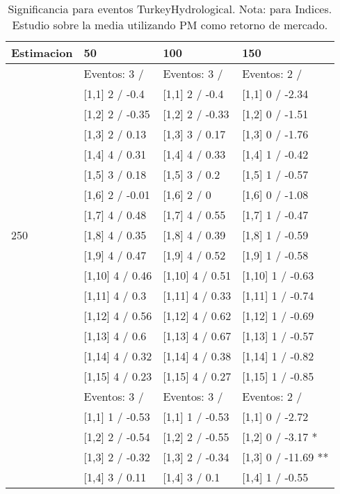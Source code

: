 \begin{table}

\caption{Significancia para eventos TurkeyHydrological. Nota: para Indices. Estudio sobre la media utilizando PM como retorno de mercado.}
\centering
\begin{tabular}[t]{llll}
\toprule
Estimacion & 50 & 100 & 150\\
\midrule
 & Eventos:  3 / & Eventos:  3 / & Eventos:  2 /\\
 & {}[1,1] 2  / -0.4 & {}[1,1] 2  / -0.4 & {}[1,1] 0  / -2.34\\
 & {}[1,2] 2  / -0.35 & {}[1,2] 2  / -0.33 & {}[1,2] 0  / -1.51\\
 & {}[1,3] 2  / 0.13 & {}[1,3] 3  / 0.17 & {}[1,3] 0  / -1.76\\
 & {}[1,4] 4  / 0.31 & {}[1,4] 4  / 0.33 & {}[1,4] 1  / -0.42\\
\addlinespace
 & {}[1,5] 3  / 0.18 & {}[1,5] 3  / 0.2 & {}[1,5] 1  / -0.57\\
 & {}[1,6] 2  / -0.01 & {}[1,6] 2  / 0 & {}[1,6] 0  / -1.08\\
 & {}[1,7] 4  / 0.48 & {}[1,7] 4  / 0.55 & {}[1,7] 1  / -0.47\\
250 & {}[1,8] 4  / 0.35 & {}[1,8] 4  / 0.39 & {}[1,8] 1  / -0.59\\
 & {}[1,9] 4  / 0.47 & {}[1,9] 4  / 0.52 & {}[1,9] 1  / -0.58\\
\addlinespace
 & {}[1,10] 4  / 0.46 & {}[1,10] 4  / 0.51 & {}[1,10] 1  / -0.63\\
 & {}[1,11] 4  / 0.3 & {}[1,11] 4  / 0.33 & {}[1,11] 1  / -0.74\\
 & {}[1,12] 4  / 0.56 & {}[1,12] 4  / 0.62 & {}[1,12] 1  / -0.69\\
 & {}[1,13] 4  / 0.6 & {}[1,13] 4  / 0.67 & {}[1,13] 1  / -0.57\\
 & {}[1,14] 4  / 0.32 & {}[1,14] 4  / 0.38 & {}[1,14] 1  / -0.82\\
\addlinespace
 & {}[1,15] 4  / 0.23 & {}[1,15] 4  / 0.27 & {}[1,15] 1  / -0.85\\
 & Eventos:  3 / & Eventos:  3 / & Eventos:  2 /\\
 & {}[1,1] 1  / -0.53 & {}[1,1] 1  / -0.53 & {}[1,1] 0  / -2.72\\
 & {}[1,2] 2  / -0.54 & {}[1,2] 2  / -0.55 & {}[1,2] 0  / -3.17 *\\
 & {}[1,3] 2  / -0.32 & {}[1,3] 2  / -0.34 & {}[1,3] 0  / -11.69 **\\
\addlinespace
 & {}[1,4] 3  / 0.11 & {}[1,4] 3  / 0.1 & {}[1,4] 1  / -0.55\\

\end{tabular}
\end{table}
